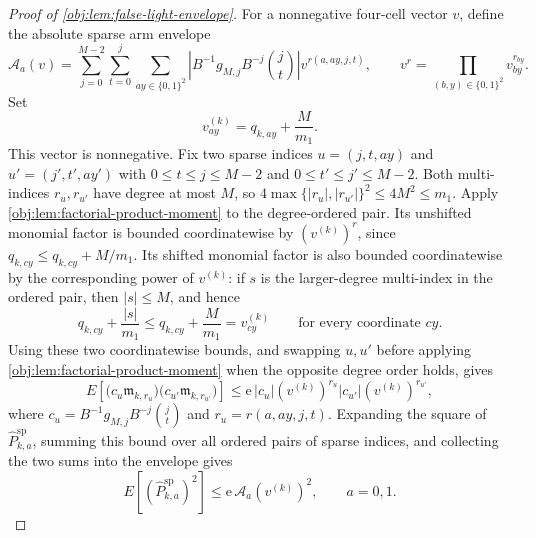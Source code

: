 \documentclass[11pt]{article}
\begin{document}
\begin{proof}[Proof of \cref{obj:lem:false-light-envelope}]
For a nonnegative four-cell vector \(v\), define the absolute sparse arm envelope
\[
\mathcal A_a(v)
=
\sum_{j=0}^{M-2}\sum_{t=0}^j\sum_{ay\in\{0,1\}^2}
\left|B^{-1}g_{M,j}B^{-j}\binom jt\right|
 v^{r(a,ay,j,t)},
\qquad
v^r=\prod_{(b,y)\in\{0,1\}^2}v_{by}^{r_{by}}.
\]
Set
\[
v^{(k)}_{ay}=q_{k,ay}+\frac{M}{m_1}.
\]
This vector is nonnegative.  Fix two sparse indices \(u=(j,t,ay)\) and \(u'=(j',t',ay')\) with \(0\le t\le j\le M-2\) and \(0\le t'\le j'\le M-2\).  Both multi-indices \(r_u,r_{u'}\) have degree at most \(M\), so \(4\max\{|r_u|,|r_{u'}|\}^2\le4M^2\le m_1\).  Apply \cref{obj:lem:factorial-product-moment} to the degree-ordered pair.  Its unshifted monomial factor is bounded coordinatewise by \((v^{(k)})^{r}\), since \(q_{k,cy}\le q_{k,cy}+M/m_1\).  Its shifted monomial factor is also bounded coordinatewise by the corresponding power of \(v^{(k)}\): if \(s\) is the larger-degree multi-index in the ordered pair, then \(|s|\le M\), and hence
\[
q_{k,cy}+\frac{|s|}{m_1}
\le
q_{k,cy}+\frac{M}{m_1}
=v^{(k)}_{cy}
\qquad\text{for every coordinate }cy.
\]
Using these two coordinatewise bounds, and swapping \(u,u'\) before applying \cref{obj:lem:factorial-product-moment} when the opposite degree order holds, gives
\[
E\!\left[
\bigl(c_u\mathfrak m_{k,r_u}\bigr)
\bigl(c_{u'}\mathfrak m_{k,r_{u'}}\bigr)
\right]
\le
\mathrm e\,
\left|c_u\right|(v^{(k)})^{r_u}
\left|c_{u'}\right|(v^{(k)})^{r_{u'}},
\]
where \(c_u=B^{-1}g_{M,j}B^{-j}\binom jt\) and \(r_u=r(a,ay,j,t)\).  Expanding the square of \(\widehat P_{k,a}^{\mathrm{sp}}\), summing this bound over all ordered pairs of sparse indices, and collecting the two sums into the envelope gives
\[
E\!\left[(\widehat P_{k,a}^{\mathrm{sp}})^2\right]
\le
\mathrm e\,\mathcal A_a(v^{(k)})^2,
\qquad a=0,1.
\]


\end{proof}
\end{document}
